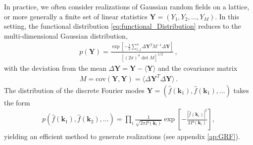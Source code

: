 \documentclass[a4paper, 11pt]{article}
\begin{document}


In practice, we often consider realizations of Gaussian random fields on a lattice, or more generally a finite set of linear statistics $\bm{Y}=(Y_1,Y_2,\dots,Y_M)$. In this setting, the functional distribution \eqref{eq:functional_Distribution} reduces to the multi-dimensional Gaussian distribution,
\begin{align}
p(\bm{Y}) = \frac{\exp\left[-\frac{1}{2} \sum_{i,j}^n \Delta \bm{Y}^T M^{-1} \Delta \bm{Y}\right]}{[(2\pi)^n \det M]^{1/2}}\,,
\end{align}
with the deviation from the mean $\Delta \bm{Y} = \bm{Y} - \langle \bm{Y}\rangle$ and the covariance matrix
\begin{align}
M = \text{cov}(\bm{Y},\bm{Y}) = \langle \Delta \bm{Y}^T \Delta \bm{Y}\rangle\,.
\end{align}
The distribution of the discrete Fourier modes $\bm{Y}=(\hat{f}(\bm{k}_1),\hat{f}(\bm{k}_1),\dots)$ takes the form 
\begin{align}
p(\hat{f}(\bm{k}_1), \hat{f}(\bm{k}_2), \dots) = \prod_{i} \frac{1}{\sqrt{2\pi P( \bm{k}_i)}} \exp\left[-\frac{|\hat{f}(\bm{k}_i)|^2}{2P(\bm{k}_i)}\right],
\end{align}
yielding an efficient method to generate realizations (see appendix \ref{ap:GRF}).
\end{document}

